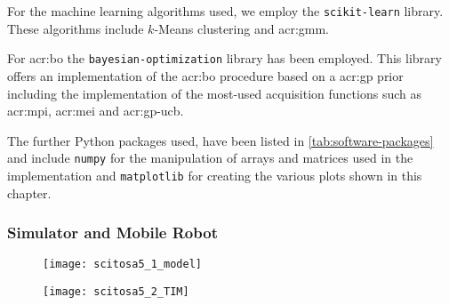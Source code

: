 For the machine learning algorithms used, we employ the \texttt{scikit-learn} library. These algorithms include $k$-Means clustering and \acrfull{acr:gmm}.

For \acrlong{acr:bo} the \texttt{bayesian-optimization} library \cite{nogueirabayesianoptimization} has been employed. This library offers an implementation of the \acrshort{acr:bo} procedure based on a \acrshort{acr:gp} prior including the implementation of the most-used acquisition functions such as \acrshort{acr:mpi}, \acrshort{acr:mei} and \acrshort{acr:gp-ucb}.

The further Python packages used, have been listed in \autoref{tab:software-packages} and include \texttt{numpy} for the manipulation of arrays and matrices used in the implementation and \texttt{matplotlib} for creating the various plots shown in this chapter.

\subsubsection{Simulator and Mobile Robot}
\label{sec:simulator}

\begin{figure}[t]
\centering
\begin{minipage}{0.4\textwidth}
	\centering
	\texttt{[image: scitosa5\_1\_model]}
	\label{fig:scitosa5}
\end{minipage}
\qquad
\begin{minipage}{0.4\textwidth}
	\centering
	\vspace{23pt}
	\texttt{[image: scitosa5\_2\_TIM]}
	\vspace{-10pt}
	\label{fig:scitosa5_2}
\end{minipage}
\end{figure}

